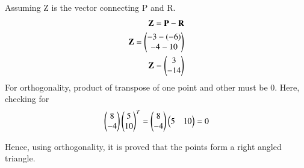 \documentclass[journal,12pt,twocolumn]{IEEEtran}
\begin{document}
Assuming Z is the vector connecting P and R. 
\begin{align}
\mathbf{Z} = \mathbf{P}-\mathbf{R}
\\
         \mathbf{Z}=\begin{pmatrix}-3-(-6)\\ -4-10\end{pmatrix}
 \\\mathbf{Z}= \begin{pmatrix}
3\\
-14 
\end{pmatrix}
\end{align}
For orthogonality, product of transpose of one point and other must be 0. 
Here, checking for 
\begin{equation}
 \begin{pmatrix}8\\-4\end{pmatrix}\begin{pmatrix}5\\10\end{pmatrix}^{T} =  \begin{pmatrix}8\\-4\end{pmatrix} \begin{pmatrix}5&10\end{pmatrix}=0
\end{equation}
   

Hence, using orthogonality, it is proved that the points form a right angled triangle. 
\end{document}

